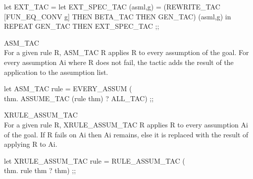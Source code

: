 \enddocs
{}
\endmoddef
let EXT_TAC  =
    let EXT_SPEC_TAC (asml,g) = 
        (REWRITE_TAC [FUN_EQ_CONV g] 
        THEN BETA_TAC THEN GEN_TAC) (asml,g) in
    REPEAT GEN_TAC THEN EXT_SPEC_TAC ;;
\endcode
{}


\begin{RULE}{ASM\_TAC}\\
For a given rule \code{}R\edoc{}, \code{}ASM_TAC R\edoc{} applies \code{}R\edoc{} to every
assumption of the goal. For every assumption \code{}Ai\edoc{} where \code{}R\edoc{} does
not fail, the tactic adds the result of the application to the
assumption list.
\end{RULE}

\enddocs
{}
\endmoddef
let ASM_TAC rule = EVERY_ASSUM (\\thm. ASSUME_TAC (rule thm) ? ALL_TAC) ;;
\endcode
{}


\begin{RULE}{XRULE\_ASSUM\_TAC}\\
For a given rule \code{}R\edoc{}, \code{}XRULE_ASSUM_TAC R\edoc{} applies \code{}R\edoc{} to every
assumption \code{}Ai\edoc{} of the goal. If \code{}R\edoc{} fails on \code{}Ai\edoc{} then \code{}Ai\edoc{}
remains, else it is replaced with the result of applying \code{}R\edoc{} to \code{}Ai\edoc{}.
\end{RULE}

\enddocs
{}
\endmoddef
let XRULE_ASSUM_TAC rule = RULE_ASSUM_TAC (\\thm. rule thm ? thm) ;;
\endcode

